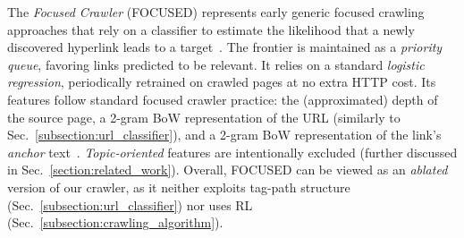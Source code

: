 The \emph{Focused Crawler} (\textsf{\small FOCUSED}) represents early generic focused crawling approaches that rely on a classifier to estimate the likelihood that a newly discovered hyperlink leads to a target~\cite{chakrabarti1999focused,diligenti2000focused}. The frontier is maintained as a \emph{priority queue},  favoring links predicted to be relevant. It relies on a standard \emph{logistic regression}, periodically retrained on crawled pages at no extra HTTP cost.
Its features follow standard focused crawler practice: the (approximated) depth of the source page, a 2-gram BoW representation of the URL (similarly to Sec.~\ref{subsection:url_classifier}), and a 2-gram BoW representation of the link's \emph{anchor} text~\cite{chakrabarti1999focused,diligenti2000focused}. \emph{Topic-oriented} features are intentionally excluded (further discussed in Sec.~\ref{section:related_work}). Overall, \textsf{\small FOCUSED} can be viewed as an \emph{ablated} version of our crawler, as it neither exploits tag-path structure (Sec.~\ref{subsection:url_classifier}) nor uses RL (Sec.~\ref{subsection:crawling_algorithm}).


